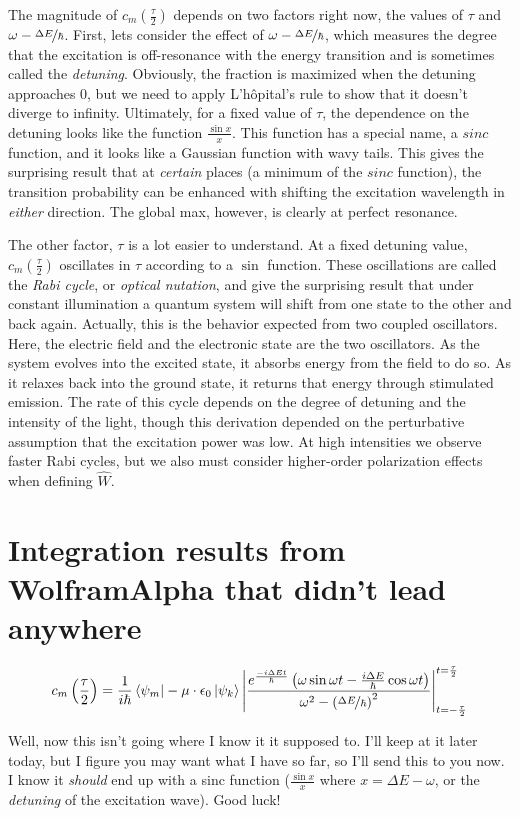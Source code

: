 \documentclass[12pt, openany, letterpaper]{memoir}
\begin{document}
The magnitude of $c_m\left(\frac{\tau}{2}\right)$ depends on two factors right now, the values of $\tau$ and $\omega - \nicefrac{\Delta E}{\hbar}$. First, lets consider the effect of $\omega - \nicefrac{\Delta E}{\hbar}$, which measures the degree that the excitation is off-resonance with the energy transition and is sometimes called the \emph{detuning}. Obviously, the fraction is maximized when the detuning approaches $0$, but we need to apply L'h\^opital's rule to show that it doesn't diverge to infinity. Ultimately, for a fixed value of $\tau$, the dependence on the detuning looks like the function $\frac{\sin x}{x}$. This function has a special name, a $sinc$ function, and it looks like a Gaussian function with wavy tails. This gives the surprising result that at \emph{certain} places (a minimum of the $sinc$ function), the transition probability can be enhanced with shifting the excitation wavelength in \emph{either} direction. The global max, however, is clearly at perfect resonance.

The other factor, $\tau$ is a lot easier to understand. At a fixed detuning value, $c_m\left(\frac{\tau}{2}\right)$ oscillates in $\tau$ according to a $\sin$ function. These oscillations are called the \emph{Rabi cycle}, or \emph{optical nutation}, and give the surprising result that under constant illumination a quantum system will shift from one state to the other and back again. Actually, this is the behavior expected from two coupled oscillators. Here, the electric field and the electronic state are the two oscillators. As the system evolves into the excited state, it absorbs energy from the field to do so. As it relaxes back into the ground state, it returns that energy through stimulated emission. The rate of this cycle depends on the degree of detuning and the intensity of the light, though this derivation depended on the perturbative assumption that the excitation power was low. At high intensities we observe faster Rabi cycles, but we also must consider higher-order polarization effects when defining $\widehat{W}$.

\section*{Integration results from WolframAlpha that didn't lead anywhere}

$$
c_m\left(\frac{\tau}{2}\right) = \frac{1}{i\hbar}\left< \psi_m \right|-\mathbf{\mu}\cdot\epsilon_0 \left| \psi_k \right> \left| \frac{e^{\frac{-i\Delta Et}{\hbar}}\left(\omega\sin\omega t - \frac{i\Delta E}{\hbar}\cos\omega t\right)}{\omega^2 - \left(\nicefrac{\Delta E}{\hbar}\right)^2}\right|_{t=-\frac{\tau}{2}}^{t=\frac{\tau}{2}}
$$

Well, now this isn't going where I know it it supposed to. I'll keep at it later today, but I figure you may want what I have so far, so I'll send this to you now. I know it \emph{should} end up with a sinc function ($\frac{\sin x}{x}$ where $x= \Delta E - \omega$, or the \emph{detuning} of the excitation wave). Good luck!
\end{document}
